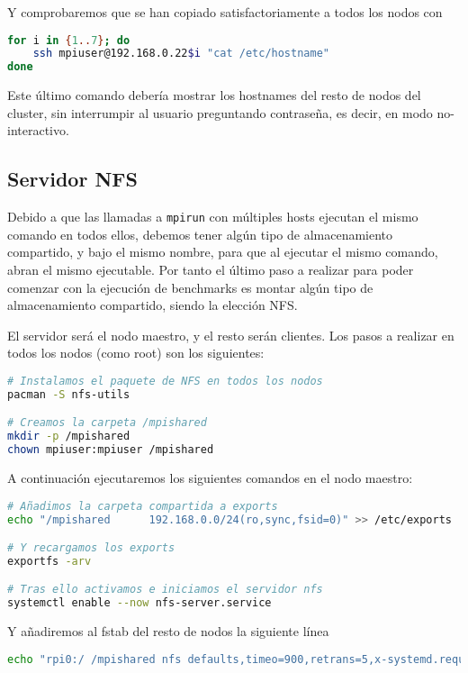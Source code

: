 Y comprobaremos que se han copiado satisfactoriamente a todos los nodos con
\begin{lstlisting}[language=bash]
for i in {1..7}; do
    ssh mpiuser@192.168.0.22$i "cat /etc/hostname"
done
\end{lstlisting}
Este último comando debería mostrar los hostnames del resto de nodos del cluster, sin interrumpir al usuario preguntando contraseña, es decir, en modo no-interactivo.


\subsection{Servidor NFS}
Debido a que las llamadas a \texttt{mpirun} con múltiples hosts ejecutan el mismo comando en todos ellos, debemos tener algún tipo de almacenamiento compartido, y bajo el mismo nombre, para que al ejecutar el mismo comando, abran el mismo ejecutable. Por tanto el último paso a realizar para poder comenzar con la ejecución de benchmarks es montar algún tipo de almacenamiento compartido, siendo la elección NFS.

El servidor será el nodo maestro, y el resto serán clientes. Los pasos a realizar en todos los nodos (como root) son los siguientes:

\begin{lstlisting}[language=bash]
# Instalamos el paquete de NFS en todos los nodos
pacman -S nfs-utils

# Creamos la carpeta /mpishared
mkdir -p /mpishared
chown mpiuser:mpiuser /mpishared
\end{lstlisting}

A continuación ejecutaremos los siguientes comandos en el nodo maestro:

\begin{lstlisting}[language=bash]
# Añadimos la carpeta compartida a exports
echo "/mpishared      192.168.0.0/24(ro,sync,fsid=0)" >> /etc/exports

# Y recargamos los exports
exportfs -arv

# Tras ello activamos e iniciamos el servidor nfs
systemctl enable --now nfs-server.service
\end{lstlisting}

Y añadiremos al fstab del resto de nodos la siguiente línea
\begin{lstlisting}[language=bash]
echo "rpi0:/ /mpishared nfs defaults,timeo=900,retrans=5,x-systemd.requires=network-online.target,_netdev 0 0" >> /etc/fstab
\end{lstlisting}

